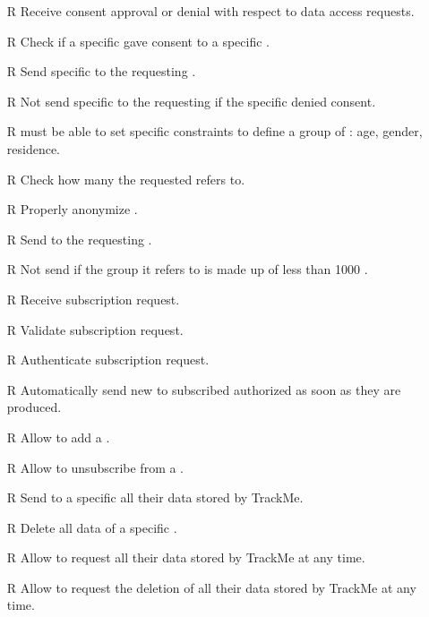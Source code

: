 \documentclass[../../../rasd.tex]{subfiles}
\begin{document}
\begin{itemize}
            \item[R\subs{17}]Receive  consent approval or denial with respect to  data access requests.
            \item[R\subs{18}]Check if a specific  gave consent to a specific .
            \item[R\subs{19}]Send specific to the requesting .
            \item[R\subs{20}]Not send specific to the requesting  if the specific  denied consent.
            \item[R\subs{21}] must be able to set specific constraints to define a group of : age, gender, residence.
            \item[R\subs{22}]Check how many  the requested  refers to.
            \item[R\subs{23}]Properly anonymize .
            \item[R\subs{24}]Send  to the requesting .
            \item[R\subs{25}]Not send  if the group it refers to is made up of less than 1000 .
            \item[R\subs{26}]Receive  subscription request.
            \item[R\subs{27}]Validate  subscription request.
            \item[R\subs{28}]Authenticate  subscription request.
            \item[R\subs{29}]Automatically send new  to subscribed authorized  as soon as they are produced.
            \item[R\subs{30}]Allow  to add a .
            \item[R\subs{31}]Allow  to unsubscribe from a .
            \item[R\subs{32}]Send to a specific  all their data stored by TrackMe.
            \item[R\subs{33}]Delete all data of a specific .
            \item[R\subs{34}]Allow  to request all their data stored by TrackMe at any time.
            \item[R\subs{35}]Allow  to request the deletion of all their data stored by TrackMe at any time.
        \end{itemize}
\end{document}
